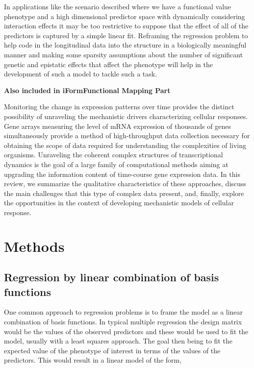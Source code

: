 \documentclass[11pt,]{book}
\theoremstyle{definition}
\theoremstyle{definition}
\theoremstyle{remark}
\begin{document}
In applications like the scenario described where we have a functional
value phenotype and a high dimensional predictor space with dynamically
considering interaction effects it may be too restrictive to suppose
that the effect of all of the predictors is captured by a simple linear
fit. Reframing the regression problem to help code in the longitudinal
data into the structure in a biologically meaningful manner and making
some sparsity assumptions about the number of significant genetic and
epistatic effects that affect the phenotype will help in the development
of such a model to tackle such a task.

\textbf{Also included in iFormFunctional Mapping Part}

Monitoring the change in expression patterns over time provides the
distinct possibility of unraveling the mechanistic drivers
characterizing cellular responses. Gene arrays measuring the level of
mRNA expression of thousands of genes simultaneously provide a method of
high-throughput data collection necessary for obtaining the scope of
data required for understanding the complexities of living organisms.
Unraveling the coherent complex structures of transcriptional dynamics
is the goal of a large family of computational methods aiming at
upgrading the information content of time-course gene expression data.
In this review, we summarize the qualitative characteristics of these
approaches, discuss the main challenges that this type of complex data
present, and, finally, explore the opportunities in the context of
developing mechanistic models of cellular response.
\cite{androulakis2007analysis}

\section{Methods}\label{methods-2}

\subsection{Regression by linear combination of basis
functions}\label{regression-by-linear-combination-of-basis-functions}

One common approach to regression problems is to frame the model as a
linear combination of basis functions. In typical multiple regression
the design matrix would be the values of the observed predictors and
these would be used to fit the model, usually with a least squares
approach. The goal then being to fit the expected value of the phenotype
of interest in terms of the values of the predictors. This would result
in a linear model of the form,
\end{document}
